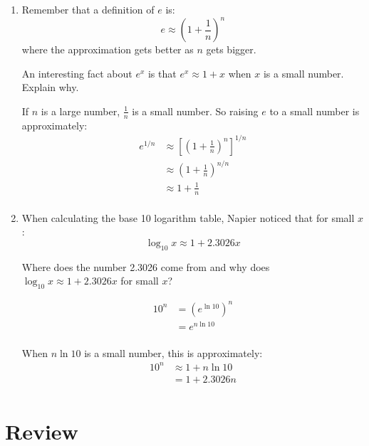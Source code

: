 \documentclass{exam}
\begin{document}
  \begin{enumerate}
    \item 
      Remember that a definition of $e$ is:
      \[
        e \approx \left( 1 + \frac{1}{n} \right)^n
      \]
      where the approximation gets better as $n$ gets bigger.

      An interesting fact about $e^x$ is that $e^x \approx 1 + x$ when $x$ is a small number.  Explain why.

      \begin{solution}
        If $n$ is a large number, $\frac{1}{n}$ is a small number.  So raising $e$ to a small number is approximately:
        \begin{align*}
          e^{1/n} & \approx \left[ \left( 1 + \frac{1}{n} \right)^n \right]^{1/n} \\
                  & \approx \left( 1 + \frac{1}{n} \right)^{n/n} \\
                  & \approx 1 + \frac{1}{n} \\
        \end{align*}

      \end{solution}
    \item 
      When calculating the base 10 logarithm table, Napier noticed that for small $x$:
      \[
        \log_{10} x \approx 1 + 2.3026x
      \]

      Where does the number 2.3026 come from and why does $\log_{10} x \approx 1 + 2.3026x$ for small $x$?

      \begin{solution}
        \begin{align*}
          10^n & = \left( e^{\ln 10} \right)^n \\
               & = e^{n \ln 10} \\
        \end{align*}

        When $n \ln 10$ is a small number, this is approximately:
        \begin{align*}
          10^n & \approx 1 + n \ln 10 \\
               & = 1 + 2.3026n \\
        \end{align*}
      \end{solution}
      
  \end{enumerate}

  \section{Review}
\end{document}
